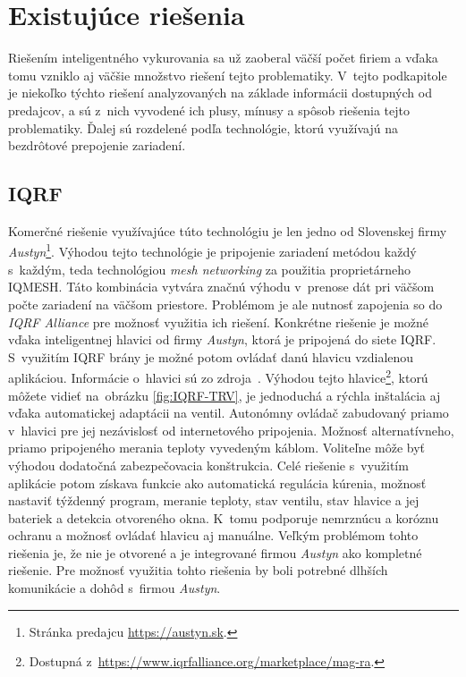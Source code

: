 \section{Existujúce riešenia}\label{analyza-solutions}
Riešením inteligentného vykurovania sa už zaoberal väčší počet firiem a vďaka tomu vzniklo aj väčšie množstvo riešení tejto problematiky. 
V~tejto podkapitole je niekoľko týchto riešení analyzovaných na základe informácii dostupných od predajcov, a sú z~nich vyvodené ich plusy, mínusy a spôsob riešenia tejto problematiky. 
Ďalej sú rozdelené podľa technológie, ktorú využívajú na bezdrôtové prepojenie zariadení.

\subsection*{IQRF}
Komerčné riešenie využívajúce túto technológiu je len jedno od Slovenskej firmy \emph{Austyn}\footnote{Stránka predajcu \url{https://austyn.sk}.}. 
Výhodou tejto technológie je pripojenie zariadení metódou každý s~každým, teda technológiou \emph{mesh networking} za použitia proprietárneho IQMESH. 
Táto kombinácia vytvára značnú výhodu v~prenose dát pri väčšom počte zariadení na väčšom priestore. 
Problémom je ale nutnosť zapojenia so do \emph{IQRF Alliance} pre možnosť využitia ich riešení.
Konkrétne riešenie je možné vďaka inteligentnej hlavici od firmy \emph{Austyn}, ktorá je pripojená do siete IQRF. 
S~využitím IQRF brány je možné potom ovládať danú hlavicu vzdialenou aplikáciou. Informácie o~hlavici sú zo zdroja~\cite{Austyn_hlavica}. 
Výhodou tejto hlavice\footnote{Dostupná z~\url{https://www.iqrfalliance.org/marketplace/mag-ra}.}, ktorú môžete vidieť na~obrázku \ref{fig:IQRF-TRV}, je jednoduchá a rýchla inštalácia aj vďaka automatickej adaptácii na ventil. 
Autonómny ovládač zabudovaný priamo v~hlavici pre jej nezávislosť od internetového pripojenia. 
Možnosť alternatívneho, priamo pripojeného merania teploty vyvedeným káblom. 
Voliteľne môže byť výhodou dodatočná zabezpečovacia konštrukcia. 
Celé riešenie s~využitím aplikácie potom získava funkcie ako automatická regulácia kúrenia, možnosť nastaviť týždenný program, meranie teploty, stav ventilu, stav hlavice a jej bateriek a detekcia otvoreného okna.
K~tomu podporuje nemrznúcu a koróznu ochranu a možnosť ovládať hlavicu aj manuálne. Veľkým problémom tohto riešenia je, že nie je otvorené a je integrované firmou \emph{Austyn} ako kompletné riešenie. 
Pre možnosť využitia tohto riešenia by boli potrebné dlhších komunikácie a dohôd s~firmou \emph{Austyn}.
